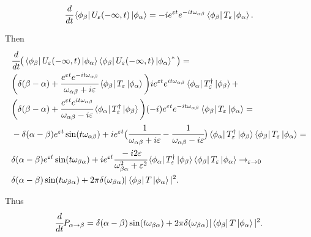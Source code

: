 \documentclass[main.tex]{subfiles}
\begin{document}
\begin{equation}
\cfrac{d}{dt}
\bra{\phi_\beta}U_\eepsilon (-\infty, t) \ket{\phi_\alpha} = -ie^{\eepsilon t}e^{-it\omega_{\alpha\beta}}\bra{\phi_\beta}T_\eepsilon \ket{\phi_\alpha}.
\end{equation}

Then
\begin{align*}
&\cfrac{d}{dt} \big( \bra{\phi_\beta}U_\eepsilon(-\infty, t) \ket{\phi_\alpha}\bra{\phi_\beta}U_\eepsilon(-\infty, t) \ket{\phi_\alpha}^*\big) = \\
& \bigg(\delta(\beta - \alpha) + \cfrac{e^{\eepsilon t}e^{-it\omega_{\alpha\beta}}}{\omega_{\alpha\beta}+i\eepsilon } \bra{\phi_\beta}T_\eepsilon \ket{\phi_\alpha}\bigg)ie^{\eepsilon t}e^{it\omega_{\alpha\beta}}\bra{\phi_\alpha}T^{\dagger}_\eepsilon \ket{\phi_\beta} + \\
& \bigg(\delta(\beta - \alpha) + \cfrac{e^{\eepsilon t}e^{it\omega_{\alpha\beta}}}{\omega_{\alpha\beta}-i\eepsilon } \bra{\phi_\alpha}T^{\dagger}_\eepsilon \ket{\phi_\beta}\bigg)(-i)e^{\eepsilon t} e^{-it\omega_{\alpha\beta}}\bra{\phi_\beta}T_\eepsilon \ket{\phi_\alpha} = \\
& - \delta(\alpha - \beta) e^{\eepsilon t}\sin(t\omega_{\alpha\beta}) + ie^{\eepsilon t}\big(\cfrac{1}{\omega_{\alpha\beta}+i\eepsilon} - \cfrac{1}{\omega_{\alpha\beta}-i\eepsilon}\big)\bra{\phi_\alpha}T^{\dagger}_\eepsilon \ket{\phi_\beta} \bra{\phi_\beta}T_\eepsilon \ket{\phi_\alpha} = \\
& \delta(\alpha - \beta) e^{\eepsilon t}\sin(t\omega_{\beta\alpha})
+ i e^{\eepsilon t} \cfrac{-i2\eepsilon}{\omega_{\beta\alpha}^2 + \eepsilon^2} \bra{\phi_\alpha}T^{\dagger}_\eepsilon \ket{\phi_\beta} \bra{\phi_\beta}T_\eepsilon \ket{\phi_\alpha} \to_{\eepsilon\to 0}\\
&\delta(\alpha - \beta) \sin(t\omega_{\beta\alpha}) + 2\pi\delta(\omega_{\beta\alpha})
|\bra{\phi_\beta}T\ket{\phi_\alpha}|^2.
\end{align*}

Thus
\begin{equation}
\cfrac{d}{dt} P_{\alpha\to\beta} = \delta(\alpha - \beta) \sin(t\omega_{\beta\alpha}) + 2\pi\delta(\omega_{\beta\alpha})
|\bra{\phi_\beta}T\ket{\phi_\alpha}|^2.
\end{equation}
\end{document}
